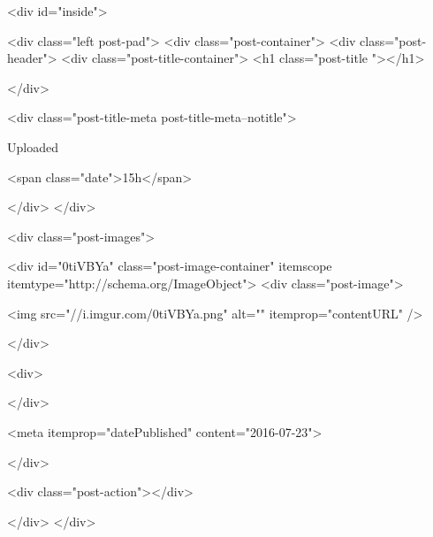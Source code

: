         <div id="inside">
        
        <div class="left post-pad">
            <div class="post-container">
                <div class="post-header">
                    <div class="post-title-container">
                                                    <h1 class="post-title "></h1>
                        
                    </div>

                    <div class="post-title-meta post-title-meta--notitle">
                        

                        
                                                    
                            Uploaded
                        

                                                    <span class="date">15h</span>
                        

                        
                        
                    </div>
                </div>

                <div class="post-images">

                                    
                    
                    

                    <div id="0tiVBYa" class="post-image-container" itemscope itemtype="http://schema.org/ImageObject">
                        <div class="post-image">
    

                        <img src="//i.imgur.com/0tiVBYa.png" alt="" itemprop="contentURL" />
        
    
</div>


                        <div>
                            
                        </div>
                            
                                                    <meta itemprop="datePublished" content="2016-07-23">
                        
                        
                        
                    </div>
                

                

                

                <div class="post-action"></div>

                
                </div>
            </div>

